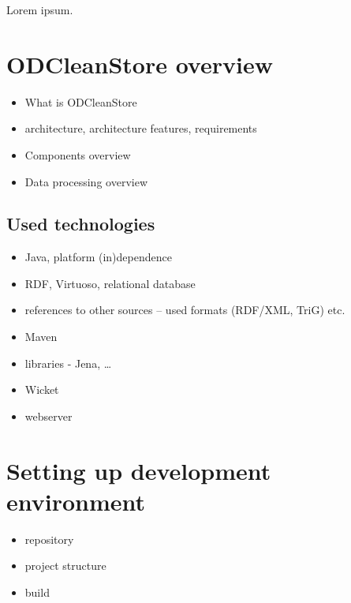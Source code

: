 
\newcommand{\version}{0.1}
\newcommand{\documentname}{\refprogrammersguide}






\renewcommand{\contentsname}{Contents}
\tableofcontents
\bigskip

\newpage


Lorem ipsum.

\chapter{ODCleanStore overview} 

\begin{itemize}
	\item What is ODCleanStore
	\item architecture, architecture features, requirements
	\item Components overview
	\item Data processing overview
\end{itemize}

\section{Used technologies}

\begin{itemize}
	\item Java, platform (in)dependence
	\item RDF, Virtuoso, relational database
	\item references to other sources -- used formats (RDF/XML, TriG) etc.
	\item Maven
	\item libraries - Jena, \ldots
	\item Wicket
	\item webserver
\end{itemize}

\chapter{Setting up development environment}

\begin{itemize}
	\item repository
	\item project structure
	\item build
\end{itemize}

